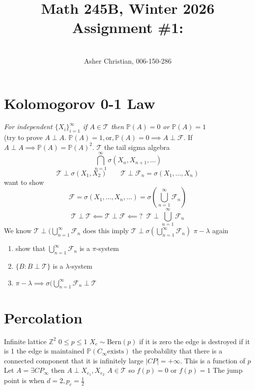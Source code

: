 \documentclass[11pt]{article}
\newcommand{\cnum}{Math 245B}
\newcommand{\ced}{Winter 2026}
\newcommand{\ctitle}[4]{\title{\vspace{-0.5in}\cnum, \ced\\Assignment #1: #2}\author{\vspace{-0.35in}\\#3, #4}}
\begin{document}
\ctitle{\#1}{}{Asher Christian}{006-150-286}
\date{}
\maketitle
\section{Kolomogorov 0-1 Law}
\emph{
    For independent $\{X_i\}_{i=1}^{\infty}$ if $A \in \mathcal{T}$ then  $ \mathbb{P}(A) = 0$ or  $ \mathbb{P}(A) = 1$\\
}
(try to prove $A \perp A$.  $ \mathbb{P}(A) = 1, \text{or}, \mathbb{P}(A) = 0 \implies A \perp \mathcal{F}$. If $A \perp A \implies \mathbb{P}(A) = \mathbb{P}(A)^2$.
$ \mathcal{T}$ the tail sigma algebra
 \[
     \bigcap_{n=1}^{\infty}\sigma(X_n,X_{n+1},\dots)
\] 
\[
    \mathcal{T} \perp \sigma(X_1,X_2) \qquad \mathcal{T} \perp \mathcal{F}_n = \sigma(X_1,\dots,X_n)
\] 
want to show
\[
    \mathcal{F} = \sigma(X_1,\dots,X_n,\dots) = \sigma(\bigcup_{n=1}^{\infty} \mathcal{F}_n)
\] 
\[
    \mathcal{T} \perp \mathcal{T} \impliedby \mathcal{T} \perp \mathcal{F} \impliedby? \;\; \mathcal{T} \perp \bigcup_{n=1}^{\infty} \mathcal{F}_n
\] 
We know $\mathcal{T} \perp (\bigcup_{n=1}^{\infty} \mathcal{F}_n$ does this imply $\mathcal{T} \perp \sigma(\bigcup_{n=1}^{\infty}\mathcal{F}_n)$ $\pi-\lambda$ again
\begin{enumerate}
    \item show that $\bigcup_{n=1}^{\infty} \mathcal{F}_n$ is a $ \pi $-system
    \item $\{B : B \perp \mathcal{T}\}$ is a  $\lambda$-system
    \item $\pi-\lambda \implies \sigma(\bigcup_{n=1}^{\infty} \mathcal{F}_n \perp \mathcal{T}$
\end{enumerate}

\section{Percolation}
Infinite lattice $ \mathbb{Z}^2$
$0 \le p \le 1$  $X_e \sim \text{Bern}(p)$ if it is zero the edge is destroyed if it is 1 the edge is maintained
$ \mathbb{P}( C_{\infty} \text{exists})$ the probability that there is a connected component that it is infinitely large $|CP| = +\infty$.
This is a function of $p$ Let  $A = \exists CP_{\infty}$ then $A \perp X_{e_1}, X_{e_2}$ $A \in \mathcal{T}$ so  $f(p) = 0$ or $f(p) = 1$ The jump point is
when  $d = 2, p_c = \frac{1}{2}$ 
\end{document}
